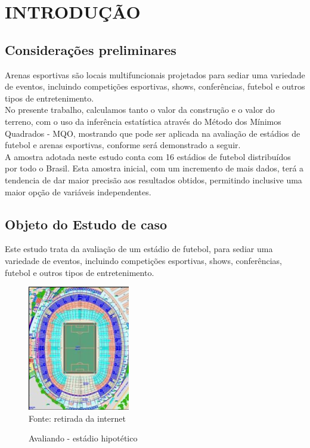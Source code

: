 
\section{INTRODUÇÃO }
\subsection{ Considerações preliminares }
%
\hspace*{1.25 cm}  Arenas esportivas são locais multifuncionais projetados para sediar uma variedade de eventos, incluindo competições esportivas, shows, conferências, futebol e outros tipos de entretenimento.\\ 
%
\hspace*{1.25 cm} No presente trabalho, calculamos tanto o valor da construção e o valor do terreno, com o uso da inferência estatística através do Método dos Mínimos Quadrados - MQO, mostrando que pode ser aplicada na avaliação de estádios de futebol e arenas esportivas, conforme será demonstrado a seguir.\\ 
%
\hspace*{1.25 cm} A amostra adotada neste estudo conta com 16 estádios de futebol distribuídos por todo o Brasil. Esta amostra inicial, com um incremento de mais dados, terá a tendencia de dar maior precisão aos resultados obtidos, permitindo inclusive uma maior opção de variáveis independentes.

\subsection{ Objeto do Estudo de caso }


\hspace*{1.25 cm}  Este estudo trata da avaliação de um estádio de futebol, para sediar uma variedade de eventos, incluindo competições esportivas, shows, conferências, futebol e outros tipos de entretenimento.
\begin{figure}[H]
	\centering  \small 	\caption{Avaliando - estádio hipotético}
	\includegraphics[width=0.347\linewidth]{figura/screenshot001}
	\label{fig:INDICES3}\\{ Fonte:  retirada da internet}
\end{figure}
